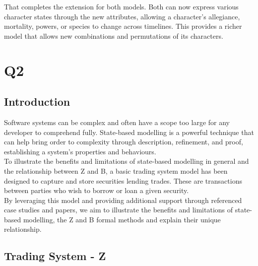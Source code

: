 \documentclass{article}
\begin{document}
\hspace{-0.7cm} That completes the extension for both models. Both can now express various character states through the new attributes, allowing a character’s allegiance, mortality, powers, or species to change across timelines. This provides a richer model that allows new combinations and permutations of its characters.

\pagebreak
\section*{Q2}

\subsection*{Introduction}

Software systems can be complex and often have a scope too large for any developer to comprehend fully. State-based modelling is a powerful technique that can help bring order to complexity through description, refinement, and proof, establishing a system's properties and behaviours. \\
\newline
To illustrate the benefits and limitations of state-based modelling in general and the relationship between Z and B, a basic trading system model has been designed to capture and store securities lending trades. These are transactions between parties who wish to borrow or loan a given security. \\
\newline
By leveraging this model and providing additional support through referenced case studies and papers, we aim to illustrate the benefits and limitations of state-based modelling, the Z and B formal methods and explain their unique relationship.

\subsection*{Trading System - Z}
\end{document}

